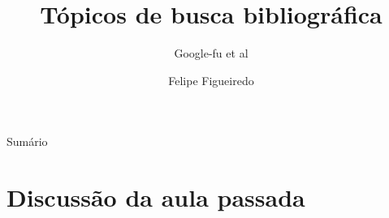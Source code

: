 \documentclass{beamer}
\title%
{Tópicos de busca bibliográfica}
\subtitle
{Google-fu et al} %
\author%
{Felipe Figueiredo}%
\institute[INTO] %
{Instituto Nacional de Traumatologia e Ortopedia
}
\date%
{}
\begin{document}
\begin{frame}
  \titlepage
\end{frame}

\begin{frame}{Sumário}
  \tableofcontents
\end{frame}








\section{Discussão da aula passada}
\end{document}
